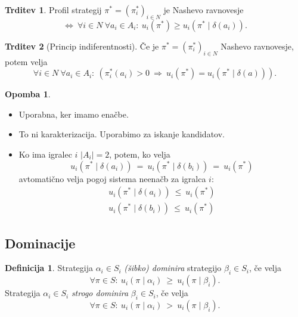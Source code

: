 \documentclass[11pt]{article}
\theoremstyle{definition}
\newtheorem{definicija}{Definicija}[section]
\theoremstyle{definition}
\newtheorem{trditev}{Trditev}[section]
\theoremstyle{definition}
\theoremstyle{definition}
\newtheorem*{opomba}{Opomba}
\begin{document}
\begin{trditev}

Profil strategij $\pi^* = (\pi_i^*)_{i\in N}$ je Nashevo ravnovesje
$$\iff~ \forall i \in N ~\forall a_i \in A_i: ~u_i(\pi^*) \geq u_i(\pi^* \mid \delta(a_i)).$$

\end{trditev}
\vspace{0.5cm}

\begin{trditev}[Princip indiferentnosti]

Če je $\pi^* = (\pi_i^*)_{i \in N}$ Nashevo ravnovesje, potem velja
$$\forall i \in N ~\forall a_i \in A_i: ~(\pi_i^*(a_i) > 0 ~\Rightarrow~ u_i(\pi^*) = u_i(\pi^* \mid \delta(a))).$$

\end{trditev}
\vspace{0.5cm}

\begin{opomba}
~
\begin{itemize}
	\item Uporabna, ker imamo enačbe.
	\item To ni karakterizacija. Uporabimo za iskanje kandidatov.
	\item Ko ima igralec $i$ $|A_i| = 2$, potem, ko velja
	$$u_i(\pi^* \mid \delta(a_i)) ~=~ u_i(\pi^* \mid \delta(b_i)) ~=~ u_i(\pi^*)$$
	avtomatično velja pogoj sistema neenačb za igralca $i$:
	\begin{align*}
	u_i(\pi^* \mid \delta(a_i)) ~\leq~ u_i(\pi^*) \\
	u_i(\pi^* \mid \delta(b_i)) ~\leq~ u_i(\pi^*)
	\end{align*}
\end{itemize}

\end{opomba}
\vspace{0.5cm}


\subsection{Dominacije}
\vspace{0.5cm}

\begin{definicija}

Strategija $\alpha_i \in S_i$ \textit{(šibko) dominira} strategijo $\beta_i \in S_i$, če velja
$$\forall \pi \in S: ~u_i(\pi \mid \alpha_i) ~\geq~ u_i(\pi \mid \beta_i).$$
Strategija $\alpha_i \in S_i$ \textit{strogo dominira} $\beta_i \in S_i$, če velja
$$\forall \pi \in S: ~u_i(\pi \mid \alpha_i) ~>~ u_i(\pi \mid \beta_i).$$

\end{definicija}
\vspace{0.5cm}
\end{document}
